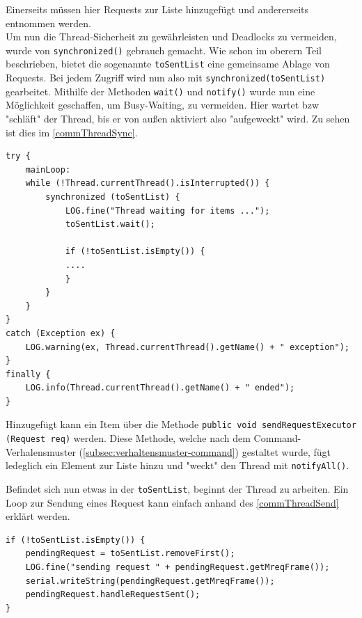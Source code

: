 Einerseits müssen hier Requests zur Liste hinzugefügt und andererseits entnommen werden.\\
Um nun die Thread-Sicherheit zu gewährleisten und Deadlocks zu vermeiden, wurde von \lstinline[style=java]{synchronized()} gebrauch gemacht.
Wie schon im oberern Teil beschrieben, bietet die sogenannte \lstinline[style=java]{toSentList} eine gemeinsame Ablage von Requests.
Bei jedem Zugriff wird nun also mit \lstinline[style=java]{synchronized(toSentList)} gearbeitet.
Mithilfe der Methoden \lstinline[style=java]{wait()} und \lstinline[style=java]{notify()} wurde nun eine Möglichkeit geschaffen, um Busy-Waiting, zu vermeiden.
Hier wartet bzw "schläft" der Thread, bis er von außen aktiviert also "aufgeweckt" wird.
Zu sehen ist dies im \autoref{commThreadSync}.
\begin{lstlisting}[style=java,caption=Java-Codebeispiel,label=commThreadSync]
try {
    mainLoop:
    while (!Thread.currentThread().isInterrupted()) {
        synchronized (toSentList) {
            LOG.fine("Thread waiting for items ...");
            toSentList.wait();

            if (!toSentList.isEmpty()) {
            ....
            }
        }
    }
}
catch (Exception ex) {
    LOG.warning(ex, Thread.currentThread().getName() + " exception");
}
finally {
    LOG.info(Thread.currentThread().getName() + " ended");
}
\end{lstlisting}
Hinzugefügt kann ein Item über die Methode \lstinline[style=java]{public void sendRequestExecutor (Request req)} werden.
Diese Methode, welche nach dem Command-Verhalensmuster (\autoref{subsec:verhaltensmuster-command}) gestaltet wurde, fügt ledeglich ein Element zur Liste hinzu und "weckt" den Thread mit \lstinline[style=java]{notifyAll()}.

Befindet sich nun etwas in der \lstinline[style=java]{toSentList}, beginnt der Thread zu arbeiten.
Ein Loop zur Sendung eines Request kann einfach anhand des \autoref{commThreadSend} erklärt werden.
\begin{lstlisting}[style=java,caption=Java-Codebeispiel,label=commThreadSend]
if (!toSentList.isEmpty()) {
    pendingRequest = toSentList.removeFirst();
    LOG.fine("sending request " + pendingRequest.getMreqFrame());
    serial.writeString(pendingRequest.getMreqFrame());
    pendingRequest.handleRequestSent();
}
\end{lstlisting}
